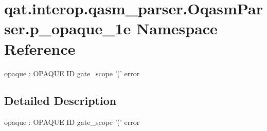 \hypertarget{namespaceqat_1_1interop_1_1qasm__parser_1_1OqasmParser_1_1p__opaque__1e}{\section{qat.\-interop.\-qasm\-\_\-parser.\-Oqasm\-Parser.\-p\-\_\-opaque\-\_\-1e Namespace Reference}
\label{namespaceqat_1_1interop_1_1qasm__parser_1_1OqasmParser_1_1p__opaque__1e}
}


opaque \-: O\-P\-A\-Q\-U\-E I\-D gate\-\_\-scope '(' error  




\subsection{Detailed Description}
opaque \-: O\-P\-A\-Q\-U\-E I\-D gate\-\_\-scope '(' error 
